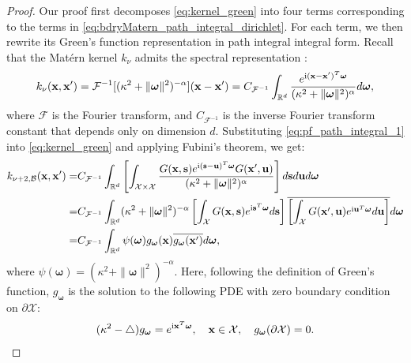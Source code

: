 \documentclass[aos,preprint]{imsart}
\theoremstyle{plain}
\newcommand{\Real}{\mathbb R}
\newcommand{\CalX}{\mathcal X}
\newcommand{\Bs}{\bold s}
\newcommand{\BFx}{\bold x}
\newcommand{\Bu}{\bold u}
\newcommand{\im}{\text{i}}
\newcommand{\CalF}{\mathcal{F}}
\newcommand{\Bomega}{\boldsymbol{\omega}}
\newcommand{\cmtS}[1]{{\color{red}{(Simon: #1)}}}
\theoremstyle{remark}
\begin{document}

\begin{proof}
Our proof first decomposes \eqref{eq:kernel_green} into four terms corresponding to the terms in \eqref{eq:bdryMatern_path_integral_dirichlet}. For each term, we then rewrite its Green's function representation in path integral integral form. Recall that the Mat\'ern kernel $k_\nu$ admits the spectral representation \cite{Wendland10}:
\begin{equation}
    \label{eq:pf_path_integral_1}
    k_\nu(\BFx,\BFx')=\CalF^{-1}[{(\kappa^2+\|\Bomega\|^2)^{-\alpha}}](\BFx-\BFx')=C_{\CalF^{-1}}\int_{\Real^d}\frac{e^{ \im (\BFx-\BFx')^T\Bomega }}{(\kappa^2+\|\Bomega\|^2)^{\alpha}}d\Bomega,
\end{equation}
where $\mathcal{F}$ is the Fourier transform, and $C_{\CalF^{-1}}$ is the inverse Fourier transform constant that depends only on dimension $d$. Substituting \eqref{eq:pf_path_integral_1} into  \eqref{eq:kernel_green} and applying Fubini's theorem, we get:
\begin{align}
    k_{\nu+2,\mathcal{B}}(\BFx,\BFx')=&C_{\CalF^{-1}}\int_{\Real^d}\left[\int_{\CalX\times\CalX}\frac{G(\BFx,\Bs)e^{ \im (\Bs-\Bu)^T\Bomega}G(\BFx',\Bu)}{(\kappa^2+\|\Bomega\|^2)^{\alpha}}\right]d\Bs d\Bu d\Bomega\nonumber\\
    =& C_{\CalF^{-1}}\int_{\Real^d}(\kappa^2+\|\Bomega\|^2)^{-\alpha}\left[\int_{\CalX}G(\BFx,\Bs)e^{ \im\Bs^T\Bomega} d\Bs\right]\overline{\left[ \int_{\CalX}G(\BFx',\Bu)e^{ \im\Bu^T\Bomega}d\Bu\right]} d\Bomega\nonumber\\
    =& C_{\CalF^{-1}}\int_{\Real^d}\psi(\Bomega) g_{\Bomega}(\BFx)\overline{g_{\Bomega}(\BFx')}d\Bomega\label{eq:pf_path_integral_2},
\end{align}
where $\psi(\Bomega)=(\kappa^2+\|\Bomega\|^2)^{-\alpha}$. Here, following the definition of Green's function, $g_{\Bomega}$ is the solution to the following PDE with zero boundary condition on $\partial\CalX$:
\begin{align*}
    (\kappa^2-\bigtriangleup)g_{\Bomega}=e^{ \im \BFx^T\Bomega},\quad \BFx\in\CalX, \quad g_{\Bomega}(\partial\CalX)=0. 
\end{align*}



\end{proof}
\end{document}
